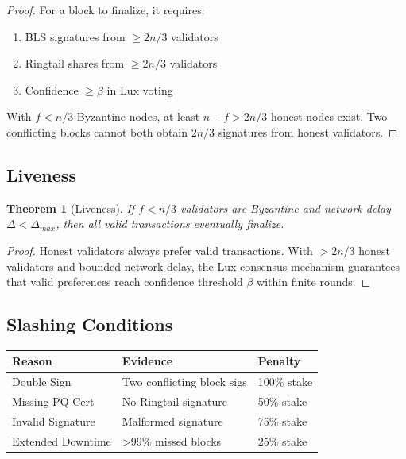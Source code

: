 \documentclass[11pt]{article}
\newtheorem{theorem}{Theorem}
\begin{document}
\begin{proof}
For a block to finalize, it requires:
\begin{enumerate}
\item BLS signatures from $\geq 2n/3$ validators
\item Ringtail shares from $\geq 2n/3$ validators
\item Confidence $\geq \beta$ in Lux voting
\end{enumerate}

With $f < n/3$ Byzantine nodes, at least $n - f > 2n/3$ honest nodes exist. Two conflicting blocks cannot both obtain $2n/3$ signatures from honest validators.
\end{proof}

\subsection{Liveness}

\begin{theorem}[Liveness]
If $f < n/3$ validators are Byzantine and network delay $\Delta < \Delta_{max}$, then all valid transactions eventually finalize.
\end{theorem}

\begin{proof}
Honest validators always prefer valid transactions. With $>2n/3$ honest validators and bounded network delay, the Lux consensus mechanism guarantees that valid preferences reach confidence threshold $\beta$ within finite rounds.
\end{proof}

\subsection{Slashing Conditions}

\begin{table}[h]
\centering
\begin{tabular}{@{}lll@{}}
\toprule
\textbf{Reason} & \textbf{Evidence} & \textbf{Penalty} \\
\midrule
Double Sign & Two conflicting block sigs & 100\% stake \\
Missing PQ Cert & No Ringtail signature & 50\% stake \\
Invalid Signature & Malformed signature & 75\% stake \\
Extended Downtime & >99\% missed blocks & 25\% stake \\
\bottomrule
\end{tabular}

\label{tab:slashing}
\end{table}
\end{document}
